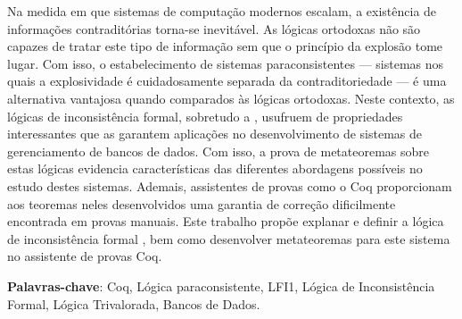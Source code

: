 
\setlength{\absparsep}{18pt} %
\begin{resumo}
    Na medida em que sistemas de computação modernos escalam, a existência de informações contraditórias torna-se inevitável. As lógicas ortodoxas não são capazes de tratar este tipo de informação sem que o princípio da explosão tome lugar. Com isso, o estabelecimento de sistemas paraconsistentes {---} sistemas nos quais a explosividade é cuidadosamente separada da contraditoriedade {---} é uma alternativa vantajosa quando comparados às lógicas ortodoxas. Neste contexto, as lógicas de inconsistência formal, sobretudo a \lfium{}, usufruem de propriedades interessantes que as garantem aplicações no desenvolvimento de sistemas de gerenciamento de bancos de dados. Com isso, a prova de metateoremas sobre estas lógicas evidencia características das diferentes abordagens possíveis no estudo destes sistemas. Ademais, assistentes de provas como o Coq proporcionam aos teoremas neles desenvolvidos uma garantia de correção dificilmente encontrada em provas manuais. Este trabalho propõe explanar e definir a lógica de inconsistência formal \lfium{}, bem como desenvolver metateoremas para este sistema no assistente de provas Coq.

 \textbf{Palavras-chave}: Coq, Lógica paraconsistente, LFI1, Lógica de Inconsistência Formal, Lógica Trivalorada, Bancos de Dados.
\end{resumo}

